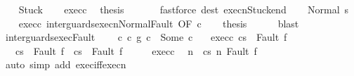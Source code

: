 \begin{isabellebody}
\isamarkupfalse%
\isanewline
\ \ \isamarkupfalse%
\ Stuck\isanewline
\ \ \isamarkupfalse%
\ exec{\isacharunderscore}c\ \isamarkupfalse%
\ {\isacharquery}thesis\ \isanewline
\ \ \ \ \isamarkupfalse%
\ {\isacharparenleft}fastforce\ dest{\isacharcolon}\ execn{\isacharunderscore}Stuck{\isacharunderscore}end{\isacharparenright}\isanewline
{}\isamarkupfalse%
\isanewline
\ \ \isamarkupfalse%
\ {\isacharparenleft}Normal\ s{\isacharprime}{\isacharparenright}\isanewline
\ \ \isamarkupfalse%
\ exec{\isacharunderscore}c\ inter{\isacharunderscore}guards{\isacharunderscore}execn{\isacharunderscore}Normal{\isacharunderscore}Fault\ {\isacharbrackleft}OF\ c{\isacharbrackright}\isanewline
\ \ \isamarkupfalse%
\ {\isacharquery}thesis\isanewline
\ \ \ \ \isamarkupfalse%
\ blast\isanewline
{}\isamarkupfalse%
%
\endisatagproof
{\isafoldproof}%
%
\isadelimproof
\isanewline
%
\endisadelimproof
\isanewline
{}\isamarkupfalse%
\ inter{\isacharunderscore}guards{\isacharunderscore}exec{\isacharunderscore}Fault{\isacharcolon}\ \isanewline
\ \ \ c{\isacharcolon}\ {\isachardoublequoteopen}{\isacharparenleft}c{}\ {\isasyminter}\isactrlsub g\ c{}{\isacharparenright}\ {\isacharequal}\ Some\ c{\isachardoublequoteclose}\isanewline
\ \ \ exec{\isacharunderscore}c{\isacharcolon}\ {\isachardoublequoteopen}{\isasymGamma}{\isasymturnstile}{\isasymlangle}c{\isacharcomma}s{\isasymrangle}\ {\isasymRightarrow}\ Fault\ f{\isachardoublequoteclose}\ \isanewline
\ \ \ {\isachardoublequoteopen}{\isasymGamma}{\isasymturnstile}{\isasymlangle}c{}{\isacharcomma}s{\isasymrangle}\ {\isasymRightarrow}\ Fault\ f\ {\isasymor}\ {\isasymGamma}{\isasymturnstile}{\isasymlangle}c{}{\isacharcomma}s{\isasymrangle}\ {\isasymRightarrow}\ Fault\ f{\isachardoublequoteclose}\isanewline
%
\isadelimproof
%
\endisadelimproof
%
\isatagproof
{}\isamarkupfalse%
\ {\isacharminus}\isanewline
\ \ \isamarkupfalse%
\ exec{\isacharunderscore}c\ \isamarkupfalse%
\ n\ \ {\isachardoublequoteopen}{\isasymGamma}{\isasymturnstile}{\isasymlangle}c{\isacharcomma}s{\isasymrangle}\ {\isacharequal}n{\isasymRightarrow}\ Fault\ f{\isachardoublequoteclose}\isanewline
\ \ \ \ \isamarkupfalse%
\ {\isacharparenleft}auto\ simp\ add{\isacharcolon}\ exec{\isacharunderscore}iff{\isacharunderscore}execn{\isacharparenright}\isanewline

\end{isabellebody}
